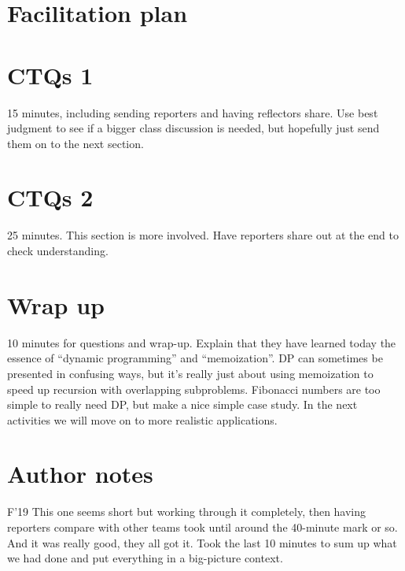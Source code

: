 \documentclass{tufte-handout}
\begin{document}
\newpage

\section{Facilitation plan}
\label{sec:facilitation}

\section{CTQs 1}

15 minutes, including sending reporters and having reflectors share.
Use best judgment to see if a bigger class discussion is needed, but
hopefully just send them on to the next section.

\section{CTQs 2}

25 minutes.  This section is more involved.  Have reporters share out
at the end to check understanding.

\section{Wrap up}

10 minutes for questions and wrap-up.  Explain that they have learned
today the essence of ``dynamic programming'' and ``memoization''. DP
can sometimes be presented in confusing ways, but it's really just
about using memoization to speed up recursion with overlapping
subproblems.  Fibonacci numbers are too simple to really need DP, but
make a nice simple case study.  In the next activities we will move on
to more realistic applications.

\newpage

\section{Author notes}
\label{sec:author}

\begin{reflect}{F'19}
This one seems short but working through it completely, then having
reporters compare with other teams took until around the 40-minute
mark or so.  And it was really good, they all got it.  Took the last
10 minutes to sum up what we had done and put everything in a
big-picture context.
\end{reflect}
\end{document}
